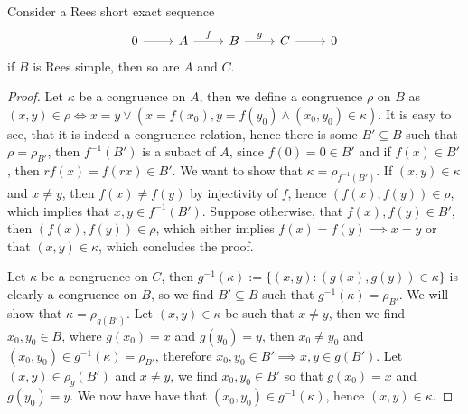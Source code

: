 \begin{proposition}
    Consider a Rees short exact sequence 
    \[
        \begin{tikzcd}
            0 & A & B & C & 0
            \arrow[from=1-1, to=1-2]
            \arrow["f", from=1-2, to=1-3]
            \arrow["g", from=1-3, to=1-4]
            \arrow[from=1-4, to=1-5]
        \end{tikzcd}
    \]
    if $B$ is Rees simple, then so are $A$ and $C$.
\end{proposition}
\begin{proof}
    Let $\kappa$ be a congruence on $A$, then we define a congruence $\rho$ on $B$ as $(x,y)\in\rho \iff x=y \lor (x=f(x_0), y=f(y_0) \land (x_0,y_0)\in\kappa)$. 
    It is easy to see, that it is indeed a congruence relation, hence there is some $B'\subseteq B$ such that $\rho = \rho_{B'}$, then 
    $f^{-1}(B')$ is a subact of $A$, since $f(0)=0\in B'$ and if $f(x)\in B'$, then $rf(x)=f(rx)\in B'$. We want to show that 
    $\kappa = \rho_{f^{-1}(B')}$. If $(x,y)\in\kappa$ and $x\neq y$, then $f(x)\neq f(y)$ by injectivity of $f$, hence 
    $(f(x),f(y))\in\rho$, which implies that $x,y\in f^{-1}(B')$. Suppose otherwise, that $f(x),f(y)\in B'$, then $(f(x),f(y))\in\rho$, 
    which either implies $f(x)=f(y) \implies x=y$ or that $(x,y)\in\kappa$, which concludes the proof.\par
    Let $\kappa$ be a congruence on $C$, then $g^{-1}(\kappa) := \{(x,y) : (g(x),g(y))\in\kappa\}$ is clearly a congruence on 
    $B$, so we find $B'\subseteq B$ such that $g^{-1}(\kappa)=\rho_{B'}$. We will show that $\kappa=\rho_{g(B')}$. Let $(x,y)\in\kappa$ be such that $x\neq y$, then we find $x_0,y_0\in B$, where 
    $g(x_0)=x$ and $g(y_0)=y$, then $x_0\neq y_0$ and $(x_0,y_0)\in g^{-1}(\kappa)=\rho_{B'}$, therefore $x_0,y_0\in B' \implies x,y\in g(B')$. Let $(x,y)\in\rho_g(B')$ and $x\neq y$,
    we find $x_0,y_0\in B'$ so that $g(x_0)=x$ and $g(y_0)=y$. We now have have that $(x_0,y_0)\in g^{-1}(\kappa)$, hence $(x,y)\in\kappa$.
\end{proof}